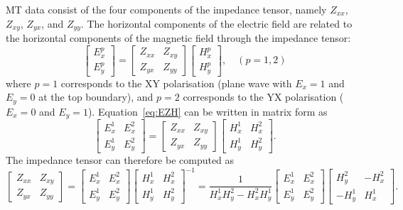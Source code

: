 \documentclass{article}
\begin{document}
MT data consist of the four components of the impedance tensor, namely $Z_{xx}$, $Z_{xy}$, $Z_{yx}$, and $Z_{yy}$. The horizontal components of the electric field are related to the horizontal components of the magnetic field through the impedance tensor:
\begin{equation}\label{eq:EZH}
  \begin{bmatrix}
  E_x^p \\
  E_y^p 
  \end{bmatrix}=\begin{bmatrix}
    Z_{xx} & Z_{xy}\\
    Z_{yx} & Z_{yy}
    \end{bmatrix}  \begin{bmatrix}
  H_x^p\\
  H_y^p 
  \end{bmatrix}, \quad (p=1,2)
\end{equation}
where $p=1$ corresponds to the XY polarisation (plane wave with $E_x=1$ and $E_y=0$ at the top boundary), and $p=2$ corresponds to the YX polarisation ($E_x=0$ and $E_y=1$). Equation~\eqref{eq:EZH} can be written in matrix form as
\begin{equation}
  \begin{bmatrix}
  E_x^1 & E_x^2 \\
  E_y^1 & E_y^2
  \end{bmatrix}=\begin{bmatrix}
    Z_{xx} & Z_{xy}\\
    Z_{yx} & Z_{yy}
    \end{bmatrix}  \begin{bmatrix}
  H_x^1 & H_x^2 \\
  H_y^1 & H_y^2
  \end{bmatrix}.
\end{equation}
The impedance tensor can therefore be computed as
\begin{equation}
\begin{bmatrix}
    Z_{xx} & Z_{xy}\\
    Z_{yx} & Z_{yy}
    \end{bmatrix}= \begin{bmatrix}
  E_x^1 & E_x^2 \\
  E_y^1 & E_y^2
  \end{bmatrix}  \begin{bmatrix}
  H_x^1 & H_x^2 \\
  H_y^1 & H_y^2
  \end{bmatrix}^{-1}=\frac{1}{H_x^1 H_y^2 - H_x^2 H_y^1}\begin{bmatrix}
  E_x^1 & E_x^2 \\
  E_y^1 & E_y^2
  \end{bmatrix}  \begin{bmatrix}
  H_y^2 & -H_x^2 \\
  -H_y^1 & H_x^1
  \end{bmatrix}.
\end{equation}
\end{document}
